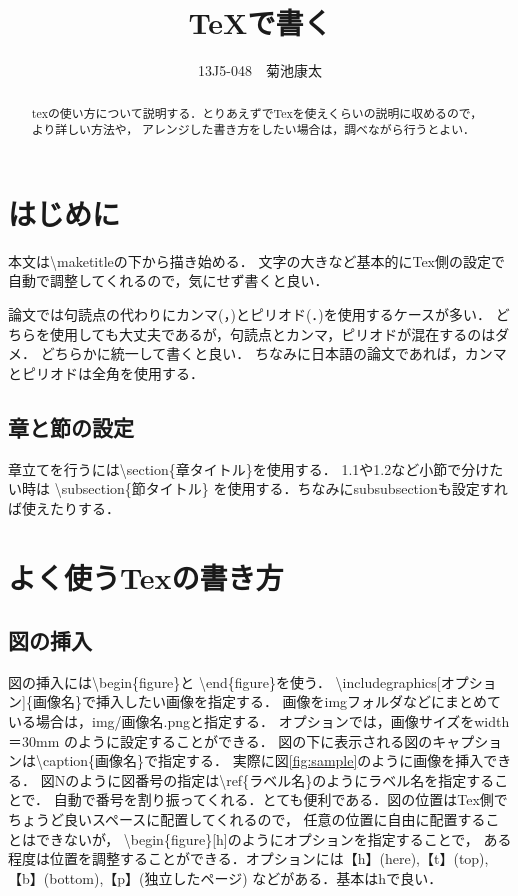 \documentclass[a4j, twocolumn]{jsarticle}
\title{TeXで書く}
\author{13J5-048　菊池康太}
\date{}
\begin{document}
\begin{abstract}
texの使い方について説明する．とりあえずでTexを使えくらいの説明に収めるので，より詳しい方法や，
アレンジした書き方をしたい場合は，調べながら行うとよい．
\end{abstract}
\maketitle

\section{はじめに}
\label{sec:introduction}
本文は\textbackslash maketitleの下から描き始める．
文字の大きなど基本的にTex側の設定で自動で調整してくれるので，気にせず書くと良い．

論文では句読点の代わりにカンマ(，)とピリオド(．)を使用するケースが多い．
どちらを使用しても大丈夫であるが，句読点とカンマ，ピリオドが混在するのはダメ．
どちらかに統一して書くと良い．
ちなみに日本語の論文であれば，カンマとピリオドは全角を使用する．



\subsection{章と節の設定}
章立てを行うには\textbackslash section\{章タイトル\}を使用する．
1.1や1.2など小節で分けたい時は
\textbackslash subsection\{節タイトル\}
を使用する．ちなみにsubsubsectionも設定すれば使えたりする．




\section{よく使うTexの書き方}
\subsection{図の挿入}
図の挿入には\textbackslash begin\{figure\}と
\textbackslash end\{figure\}を使う．
\textbackslash includegraphics[オプション]\{画像名\}で挿入したい画像を指定する．
画像をimgフォルダなどにまとめている場合は，img/画像名.pngと指定する．
オプションでは，画像サイズをwidth＝30mm のように設定することができる．
図の下に表示される図のキャプションは\textbackslash caption\{画像名\}で指定する．
実際に図\ref{fig:sample}のように画像を挿入できる．
図Nのように図番号の指定は\textbackslash ref\{ラベル名\}のようにラベル名を指定することで．
自動で番号を割り振ってくれる．とても便利である．図の位置はTex側でちょうど良いスペースに配置してくれるので，
任意の位置に自由に配置することはできないが，
\textbackslash begin\{figure\}[h]のようにオプションを指定することで，
ある程度は位置を調整することができる．オプションには【h】(here),【t】(top),
【b】(bottom),【p】(独立したページ) などがある．基本はhで良い．
\end{document}
